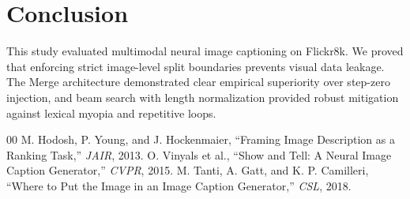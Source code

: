 \documentclass[conference]{IEEEtran}
\begin{document}
\section{Conclusion}
This study evaluated multimodal neural image captioning on Flickr8k. We proved that enforcing strict image-level split boundaries prevents visual data leakage. The Merge architecture demonstrated clear empirical superiority over step-zero injection, and beam search with length normalization provided robust mitigation against lexical myopia and repetitive loops.

\begin{thebibliography}{00}
 M. Hodosh, P. Young, and J. Hockenmaier, ``Framing Image Description as a Ranking Task,'' \textit{JAIR}, 2013.
 O. Vinyals et al., ``Show and Tell: A Neural Image Caption Generator,'' \textit{CVPR}, 2015.
 M. Tanti, A. Gatt, and K. P. Camilleri, ``Where to Put the Image in an Image Caption Generator,'' \textit{CSL}, 2018.
\end{thebibliography}
\end{document}
